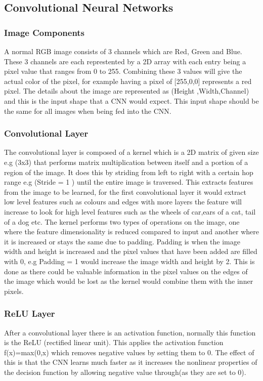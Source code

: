 \documentclass{csfyp}
\begin{document}
\subsection{Convolutional Neural Networks}
\subsubsection{Image Components}
A normal RGB image consists of 3 channels which are Red, Green and Blue. These 3 channels are each represtented by a 2D array with each entry being a pixel value that ranges from 0 to 255. Combining these 3 values will give the actual color of the pixel, for example having a pixel of [255,0,0] represents a red pixel. The details about the image are represented as (Height ,Width,Channel) and this is the input shape that a CNN would expect. This input shape should be the same for all images when being fed into the CNN.


\subsubsection{Convolutional Layer}
The convolutional layer is composed of a kernel which is a 2D matrix of given size e.g (3x3) that performs matrix multiplication between itself and a portion of a region of the image. It does this by striding from left to right with a certain hop range e.g (Stride = 1 ) until the entire image is traversed. This extracts features from the image to be learned, for the first convolutional layer it would extract low level features such as colours and edges with more layers the feature will increase to look for high level features such as the wheels of car,ears of a cat, tail of a dog etc. The kernel performs two types of operations on the image, one where the feature dimensionality is reduced compared to input and another where it is increased or stays the same due to padding. Padding is when the image width and height is increased and the pixel values that have been added are filled with 0, e.g Padding = 1 would increase the image width and height by 2. This is done as there could be valuable information in the pixel values on the edges of the image which would be lost as the kernel would combine them with the inner pixels.

\subsubsection{ReLU Layer}
After a convolutional layer there is an activation function, normally this function is the ReLU (rectified linear unit). This applies the activation function f(x)=max(0,x) which removes negative values by setting them to 0. The effect of this is that the CNN learns much faster as it increases the nonlinear properties of the decision function by allowing negative value through(as they are set to 0).
\end{document}
